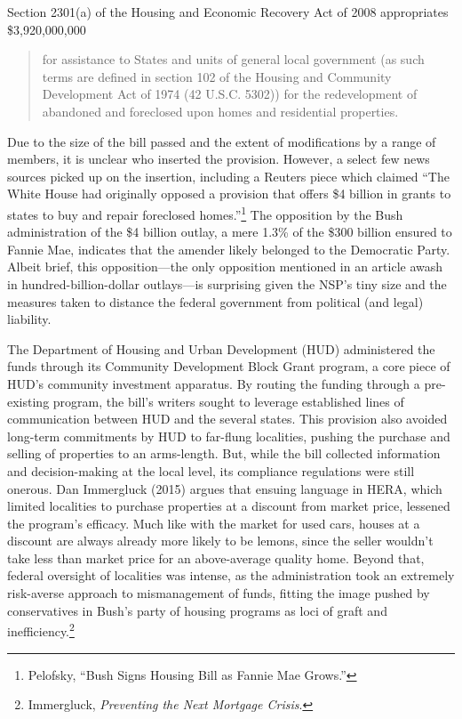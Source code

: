 \documentclass[
]{article}
\begin{document}
Section 2301(a) of the Housing and Economic Recovery Act of 2008 appropriates \$3,920,000,000

\begin{quote}
for assistance to States and units of general local government (as such terms are defined in section 102 of the Housing and Community Development Act of 1974 (42 U.S.C. 5302)) for the redevelopment of abandoned and foreclosed upon homes and residential properties.
\end{quote}

Due to the size of the bill passed and the extent of modifications by a range of members, it is unclear who inserted the provision.
However, a select few news sources picked up on the insertion, including a Reuters piece which claimed ``The White House had originally opposed a provision that offers \$4 billion in grants to states to buy and repair foreclosed homes.''\footnote{Pelofsky, ``Bush Signs Housing Bill as Fannie Mae Grows.''}
The opposition by the Bush administration of the \$4 billion outlay, a mere 1.3\% of the \$300 billion ensured to Fannie Mae, indicates that the amender likely belonged to the Democratic Party.
Albeit brief, this opposition---the only opposition mentioned in an article awash in hundred-billion-dollar outlays---is surprising given the NSP's tiny size and the measures taken to distance the federal government from political (and legal) liability.

The Department of Housing and Urban Development (HUD) administered the funds through its Community Development Block Grant program, a core piece of HUD's community investment apparatus.
By routing the funding through a pre-existing program, the bill's writers sought to leverage established lines of communication between HUD and the several states.
This provision also avoided long-term commitments by HUD to far-flung localities, pushing the purchase and selling of properties to an arms-length.
But, while the bill collected information and decision-making at the local level, its compliance regulations were still onerous.
Dan Immergluck (2015) argues that ensuing language in HERA, which limited localities to purchase properties at a discount from market price, lessened the program's efficacy.
Much like with the market for used cars, houses at a discount are always already more likely to be lemons, since the seller wouldn't take less than market price for an above-average quality home.
Beyond that, federal oversight of localities was intense, as the administration took an extremely risk-averse approach to mismanagement of funds, fitting the image pushed by conservatives in Bush's party of housing programs as loci of graft and inefficiency.\footnote{Immergluck, \emph{Preventing the Next Mortgage Crisis}.}
\end{document}
